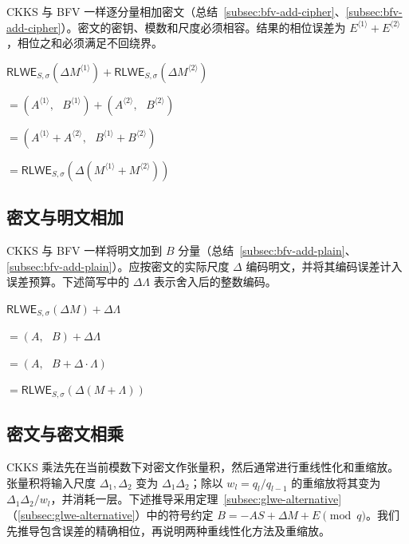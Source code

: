 CKKS 与 BFV 一样逐分量相加密文（总结~\ref*{subsec:bfv-add-cipher}、\autoref{subsec:bfv-add-cipher}）。密文的密钥、模数和尺度必须相容。结果的相位误差为 $E^{\langle1\rangle}+E^{\langle2\rangle}$，相位之和必须满足不回绕界。




\begin{tcolorbox}[title={\textbf{\tboxlabel{\ref*{subsec:ckks-add-cipher}} CKKS 密文与密文相加}}]
$\textsf{RLWE}_{S, \sigma}(\Delta M^{\langle 1 \rangle} ) + \textsf{RLWE}_{S, \sigma}(\Delta M^{\langle 2 \rangle} ) $

$ = ( A^{\langle 1 \rangle}, \text{ } B^{\langle 1 \rangle}) + (A^{\langle 2 \rangle}, \text{ } B^{\langle 2 \rangle}) $

$ = ( A^{\langle 1 \rangle} + A^{\langle 2 \rangle}, \text{ } B^{\langle 1 \rangle} + B^{\langle 2 \rangle} ) $

$= \textsf{RLWE}_{S, \sigma}(\Delta(M^{\langle 1 \rangle} + M^{\langle 2 \rangle}) )$
\end{tcolorbox}


\subsection{密文与明文相加}
\label{subsec:ckks-add-plain}

CKKS 与 BFV 一样将明文加到 $B$ 分量（总结~\ref*{subsec:bfv-add-plain}、\autoref{subsec:bfv-add-plain}）。应按密文的实际尺度 $\Delta$ 编码明文，并将其编码误差计入误差预算。下述简写中的 $\Delta\Lambda$ 表示舍入后的整数编码。



\begin{tcolorbox}[title={\textbf{\tboxlabel{\ref*{subsec:ckks-add-plain}} CKKS 密文与明文相加}}]
$\textsf{RLWE}_{S, \sigma}(\Delta M) + \Delta\Lambda $

$=  (A, \text{ } B) + \Delta\Lambda$

$=  (A, \text{ } B + \Delta\cdot\Lambda)$

$= \textsf{RLWE}_{S, \sigma}(\Delta (M + \Lambda) )$
\end{tcolorbox}




\subsection{密文与密文相乘}
\label{subsec:ckks-mult-cipher}

CKKS 乘法先在当前模数下对密文作张量积，然后通常进行重线性化和重缩放。张量积将输入尺度 $\Delta_1,\Delta_2$ 变为 $\Delta_1\Delta_2$；除以 $w_l=q_l/q_{l-1}$ 的重缩放将其变为 $\Delta_1\Delta_2/w_l$，并消耗一层。下述推导采用定理~\ref*{subsec:glwe-alternative}（\autoref{subsec:glwe-alternative}）中的符号约定 $B=-AS+\Delta M+E\pmod q$。我们先推导包含误差的精确相位，再说明两种重线性化方法及重缩放。


